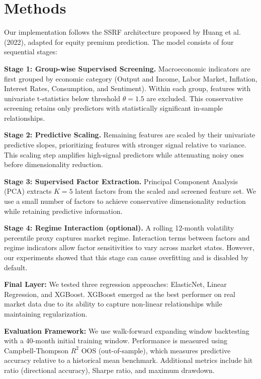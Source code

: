 \documentclass{article}
\begin{document}
\section{Methods}

Our implementation follows the SSRF architecture proposed by Huang et al. (2022), adapted for equity premium prediction. The model consists of four sequential stages:

\textbf{Stage 1: Group-wise Supervised Screening.} Macroeconomic indicators are first grouped by economic category (Output and Income, Labor Market, Inflation, Interest Rates, Consumption, and Sentiment). Within each group, features with univariate t-statistics below threshold $\theta = 1.5$ are excluded. This conservative screening retains only predictors with statistically significant in-sample relationships.

\textbf{Stage 2: Predictive Scaling.} Remaining features are scaled by their univariate predictive slopes, prioritizing features with stronger signal relative to variance. This scaling step amplifies high-signal predictors while attenuating noisy ones before dimensionality reduction.

\textbf{Stage 3: Supervised Factor Extraction.} Principal Component Analysis (PCA) extracts $K = 5$ latent factors from the scaled and screened feature set. We use a small number of factors to achieve conservative dimensionality reduction while retaining predictive information.

\textbf{Stage 4: Regime Interaction (optional).} A rolling 12-month volatility percentile proxy captures market regime. Interaction terms between factors and regime indicators allow factor sensitivities to vary across market states. However, our experiments showed that this stage can cause overfitting and is disabled by default.

\textbf{Final Layer:} We tested three regression approaches: ElasticNet, Linear Regression, and XGBoost. XGBoost emerged as the best performer on real market data due to its ability to capture non-linear relationships while maintaining regularization.

\textbf{Evaluation Framework:} We use walk-forward expanding window backtesting with a 40-month initial training window. Performance is measured using Campbell-Thompson $R^2$ OOS (out-of-sample), which measures predictive accuracy relative to a historical mean benchmark. Additional metrics include hit ratio (directional accuracy), Sharpe ratio, and maximum drawdown.
\end{document}
